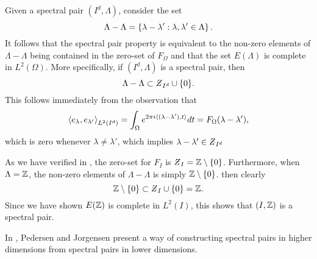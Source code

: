 \documentclass[../thesis.tex]{subfiles}
\begin{document}
\begin{remark}
    Given a spectral pair $(I^d,\Lambda)$, consider the set
    \begin{equation*}
        \Lambda - \Lambda = \left\{\lambda-\lambda' : \lambda,\lambda' \in \Lambda\right\}.
    \end{equation*}
    It follows that the spectral pair property is equivalent to the non-zero elements of $\Lambda - \Lambda$ being contained in the zero-set of $F_{\Omega}$ and that the set $E(\Lambda)$ is complete in $L^2(\Omega)$. More specifically, if $(I^d,\Lambda)$ is a spectral pair, then
    \begin{equation*} %
        \Lambda - \Lambda \subset \Zstroke_{I^d} \cup \braq{0}.
    \end{equation*}
    This follows immediately from the observation that
    \begin{equation*}
        \left \langle e_{\lambda},e_{\lambda'}  \right \rangle_{L^2(I^d)} = \int_\Omega e^{2 \pi i \langle(\lambda-\lambda'),t\rangle} dt = F_{\Omega} (\lambda-\lambda'),
    \end{equation*}
    which is zero whenever $\lambda \neq \lambda'$, which implies $\lambda-\lambda' \in \Zstroke_{I^d}$
\end{remark}

\begin{example} %
    As we have verified in , the zero-set for $F_{I}$ is  $\Zstroke_{I} = \intnozero$. Furthermore, when $\Lambda=\mathbb{Z}$, the non-zero elements of $\Lambda - \Lambda$ is simply $\mathbb{Z}\setminus\{0\}$. then clearly
    \begin{equation*}
        \intnozero \subset \Zstroke_{I} \cup \braq{0} = \Z.
    \end{equation*}
    Since we have shown $E(\mathbb{Z})$ is complete in $L^2(I)$, this shows that $(I,\mathbb{Z})$ is a spectral pair.
\end{example}

In \cite{jorgensenSpectralPairsCartesian2001}, Pedersen and Jorgensen present a way of constructing spectral pairs in higher dimensions from spectral pairs in lower dimensions. 
\end{document}
